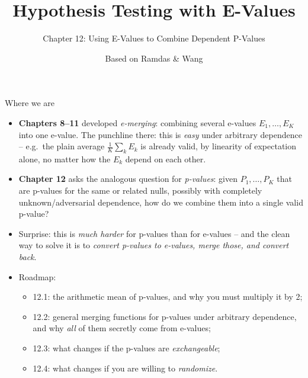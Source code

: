 \documentclass[aspectratio=169,10pt]{beamer}
\title[E-Values -- Ch.12]{Hypothesis Testing with E-Values}
\subtitle{Chapter 12: Using E-Values to Combine Dependent P-Values}
\author{Based on Ramdas \& Wang}
\date{}
\begin{document}
\begin{frame}
  \titlepage
\end{frame}

\begin{frame}{Where we are}
  \begin{itemize}
    \item \textbf{Chapters 8--11} developed \emph{e-merging}: combining several e-values $E_1,\dots,E_K$ into one e-value. The punchline there: this is \emph{easy} under arbitrary dependence -- e.g.\ the plain average $\tfrac1K\sum_k E_k$ is already valid, by linearity of expectation alone, no matter how the $E_k$ depend on each other.
    \item \textbf{Chapter 12} asks the analogous question for \emph{p-values}: given $P_1,\dots,P_K$ that are p-values for the same or related nulls, possibly with completely unknown/adversarial dependence, how do we combine them into a single valid p-value?
    \item Surprise: this is \emph{much harder} for p-values than for e-values -- and the clean way to solve it is to \emph{convert p-values to e-values, merge those, and convert back}.
    \item Roadmap:
    \begin{itemize}
      \item 12.1: the arithmetic mean of p-values, and why you must multiply it by 2;
      \item 12.2: general merging functions for p-values under arbitrary dependence, and why \emph{all} of them secretly come from e-values;
      \item 12.3: what changes if the p-values are \emph{exchangeable};
      \item 12.4: what changes if you are willing to \emph{randomize}.
    \end{itemize}
  \end{itemize}
\end{frame}
\end{document}

